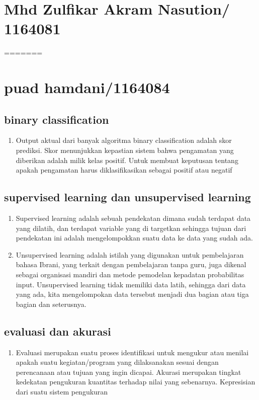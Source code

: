 \section{Mhd Zulfikar Akram Nasution/ 1164081}
=======

\section{puad hamdani/1164084}
\subsection{binary classification }
\begin{enumerate}
\item Output aktual dari banyak algoritma binary classification adalah skor prediksi. Skor menunjukkan kepastian sistem bahwa pengamatan yang diberikan adalah milik kelas positif. Untuk membuat keputusan tentang apakah pengamatan harus diklasifikasikan sebagai positif atau negatif
\end{enumerate}

\subsection{supervised learning dan unsupervised learning}
\begin{enumerate}
\item Supervised learning adalah sebuah pendekatan dimana sudah terdapat data yang dilatih, dan terdapat variable yang di targetkan sehingga tujuan dari pendekatan ini adalah mengelompokkan suatu data ke data yang sudah ada.


\item Unsupervised learning adalah istilah yang digunakan untuk pembelajaran bahasa Ibrani, yang terkait dengan pembelajaran tanpa guru, juga dikenal sebagai organisasi mandiri dan metode pemodelan kepadatan probabilitas input. Unsupervised learning tidak memiliki data latih, sehingga dari data yang ada, kita mengelompokan data tersebut menjadi dua bagian atau tiga bagian dan seterusnya.
\end{enumerate}

\subsection{evaluasi dan akurasi }
\begin{enumerate}
\item Evaluasi merupakan suatu proses identifikasi untuk mengukur atau menilai apakah suatu kegiatan/program yang dilaksanakan sesuai dengan perencanaan atau tujuan yang ingin dicapai.
Akurasi merupakan tingkat kedekatan pengukuran kuantitas terhadap nilai yang sebenarnya. Kepresisian dari suatu sistem pengukuran
\end{enumerate}

